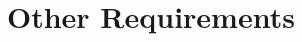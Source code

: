 \chapter{Other Requirements} \label{chp:other-requirements}
	\begin{comment}
		$<$Define any other requirements not covered elsewhere in the SRS. This might 
		include database requirements, internationalization requirements, legal 
		requirements, reuse objectives for the project, and so on. Add any new sections 
		that are pertinent to the project.$>$
	\end{comment}

